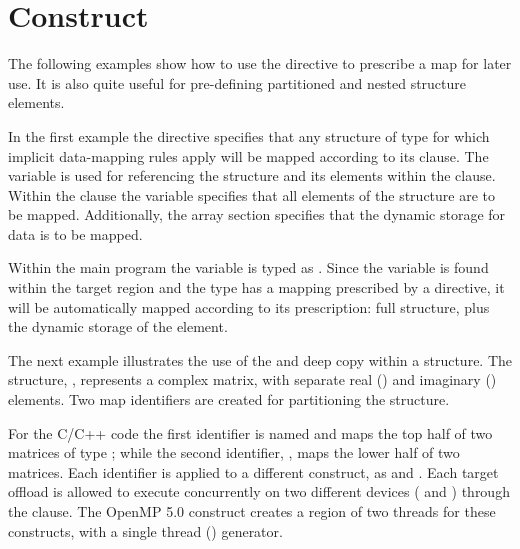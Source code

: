 \pagebreak
\section{  Construct}
\label{sec:declare_mapper}

The following examples show how to use the 
directive to prescribe a map for later use.
It is also quite useful for pre-defining partitioned and nested 
structure elements.

In the first example the  directive specifies 
that any structure of type  for which implicit data-mapping
rules apply will be mapped according to its  clause.
The variable  is used for referencing the structure and its 
elements within the  clause. 
Within the  clause the  variable specifies that all
elements of the structure are to be mapped.  Additionally, the
array section  specifies that the dynamic 
storage for data is to be mapped. 

Within the main program the  variable is typed as .
Since the variable is found within the target region and the type has a mapping prescribed by
a  directive, it will be automatically mapped according to its prescription: 
full structure, plus the dynamic storage of the  element. 




The next example illustrates the use of the  and deep copy within a structure. 
The structure, ,  represents a complex matrix, 
with separate real () and imaginary () elements.
Two map identifiers are created for partitioning the  structure.

For the C/C++ code the first identifier is named  and maps the top half of
two matrices of type ; while the second identifier, ,
maps the lower half of two matrices. 
Each identifier is applied to a different  construct,
as   
and .
Each target offload is allowed to execute concurrently on two different devices 
( and ) through the  clause.
The OpenMP 5.0  construct creates a region of two threads
for these  constructs, with a single thread () generator.

